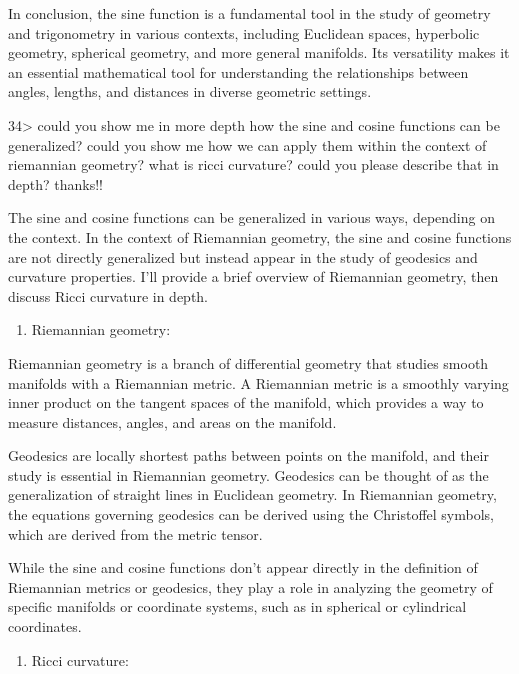 \documentclass[
]{article}
\providecommand{\tightlist}{%
  \setlength{\itemsep}{0pt}\setlength{\parskip}{0pt}}
\begin{document}
In conclusion, the sine function is a fundamental tool in the study of
geometry and trigonometry in various contexts, including Euclidean
spaces, hyperbolic geometry, spherical geometry, and more general
manifolds. Its versatility makes it an essential mathematical tool for
understanding the relationships between angles, lengths, and distances
in diverse geometric settings.

34\textgreater{} could you show me in more depth how the sine and cosine
functions can be generalized? could you show me how we can apply them
within the context of riemannian geometry? what is ricci curvature?
could you please describe that in depth? thanks!!

The sine and cosine functions can be generalized in various ways,
depending on the context. In the context of Riemannian geometry, the
sine and cosine functions are not directly generalized but instead
appear in the study of geodesics and curvature properties. I'll provide
a brief overview of Riemannian geometry, then discuss Ricci curvature in
depth.

\begin{enumerate}
\def\labelenumi{\arabic{enumi}.}
\tightlist
\item
  Riemannian geometry:
\end{enumerate}

Riemannian geometry is a branch of differential geometry that studies
smooth manifolds with a Riemannian metric. A Riemannian metric is a
smoothly varying inner product on the tangent spaces of the manifold,
which provides a way to measure distances, angles, and areas on the
manifold.

Geodesics are locally shortest paths between points on the manifold, and
their study is essential in Riemannian geometry. Geodesics can be
thought of as the generalization of straight lines in Euclidean
geometry. In Riemannian geometry, the equations governing geodesics can
be derived using the Christoffel symbols, which are derived from the
metric tensor.

While the sine and cosine functions don't appear directly in the
definition of Riemannian metrics or geodesics, they play a role in
analyzing the geometry of specific manifolds or coordinate systems, such
as in spherical or cylindrical coordinates.

\begin{enumerate}
\def\labelenumi{\arabic{enumi}.}
\setcounter{enumi}{1}
\tightlist
\item
  Ricci curvature:
\end{enumerate}
\end{document}
